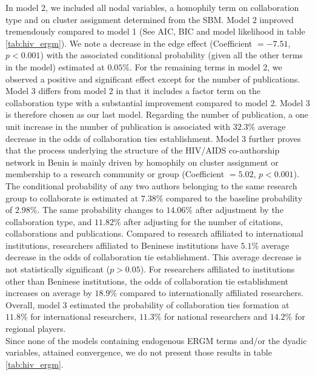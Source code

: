 In model 2, we included all nodal variables, a homophily term on collaboration type and on cluster assignment determined from the SBM. Model 2 improved tremendously compared to model 1 (See AIC, BIC and model likelihood in table \ref{tab:hiv_ergm}). We note a decrease in the edge effect (Coefficient $=-7.51$, $p<0.001$) with the associated conditional probability (given all the other terms in the model) estimated at $0.05\%$. For the remaining terms in model 2, we observed a positive and significant effect except for the number of publications. Model 3 differs from model 2 in that it includes a factor term on the collaboration type with a substantial improvement compared to model 2. Model 3 is therefore chosen as our last model. Regarding the number of publication, a one unit increase in the number of publication is associated with $32.3\%$ average decrease in the odds of collaboration ties establishment. Model 3 further proves that the process underlying the structure of the HIV/AIDS co-authorship network in Benin is mainly driven by homophily on cluster assignment or membership to a research community or group (Coefficient $=5.02$, $p<0.001$). The conditional probability of any two authors belonging to the same research group to collaborate is estimated at $7.38\%$ compared to the baseline probability of $2.98\%$. The same probability changes to $14.06\%$ after adjustment by the collaboration type, and $11.82\%$ after adjusting for the number of citations, collaborations and publications. Compared to research affiliated to international institutions, researchers affiliated to Beninese institutions have $5.1\%$ average decrease in the odds of collaboration tie establishment. This average decrease is not statistically significant ($p>0.05$). For researchers affiliated to institutions other than Beninese institutions, the odds of collaboration tie establishment increases on average by $18.9\%$ compared to internationally affiliated researchers. Overall, model 3 estimated the probability of collaboration ties formation at $11.8\%$ for international researchers, $11.3\%$ for national researchers and $14.2\%$ for regional players. \\
Since none of the models containing endogenous ERGM terms and/or the dyadic variables, attained convergence, we do not present those results in table \ref{tab:hiv_ergm}.

